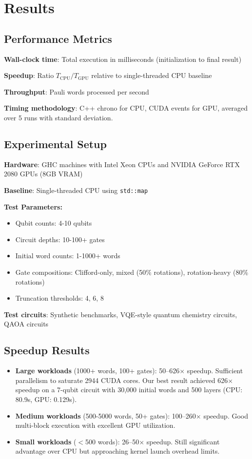 \documentclass[11pt, a4paper]{article}
\begin{document}
\section{Results}

\subsection{Performance Metrics}

\textbf{Wall-clock time}: Total execution in milliseconds (initialization to final result)

\textbf{Speedup}: Ratio $T_{\text{CPU}} / T_{\text{GPU}}$ relative to single-threaded CPU baseline

\textbf{Throughput}: Pauli words processed per second

\textbf{Timing methodology}: C++ chrono for CPU, CUDA events for GPU, averaged over 5 runs with standard deviation.

\subsection{Experimental Setup}

\textbf{Hardware}: GHC machines with Intel Xeon CPUs and NVIDIA GeForce RTX 2080 GPUs (8GB VRAM)

\textbf{Baseline}: Single-threaded CPU using \texttt{std::map}

\textbf{Test Parameters:}
\begin{itemize}
    \item Qubit counts: 4-10 qubits
    \item Circuit depths: 10-100+ gates
    \item Initial word counts: 1-1000+ words
    \item Gate compositions: Clifford-only, mixed (50\% rotations), rotation-heavy (80\% rotations)
    \item Truncation thresholds: 4, 6, 8
\end{itemize}

\textbf{Test circuits}: Synthetic benchmarks, VQE-style quantum chemistry circuits, QAOA circuits

\subsection{Speedup Results}
\begin{itemize}
    \item \textbf{Large workloads} (1000+ words, 100+ gates): 50--626$\times$ speedup. Sufficient parallelism to saturate 2944 CUDA cores. Our best result achieved 626$\times$ speedup on a 7-qubit circuit with 30,000 initial words and 500 layers (CPU: 80.9s, GPU: 0.129s).
    \item \textbf{Medium workloads} (500-5000 words, 50+ gates): 100--260$\times$ speedup. Good multi-block execution with excellent GPU utilization.
    \item \textbf{Small workloads} ($<$500 words): 26--50$\times$ speedup. Still significant advantage over CPU but approaching kernel launch overhead limits.
\end{itemize}
\end{document}
